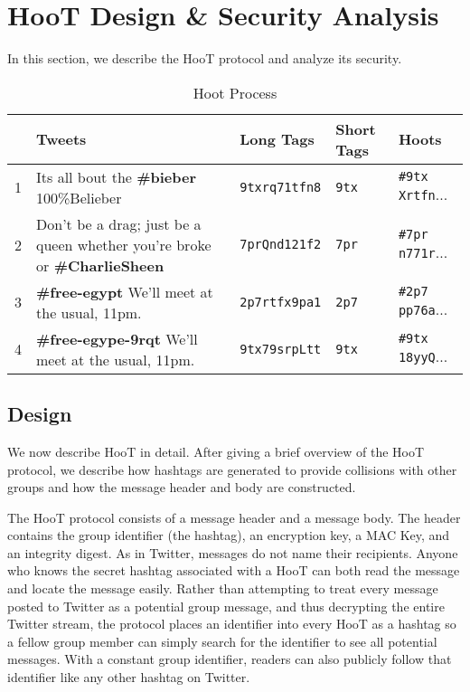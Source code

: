 \section{HooT Design \& Security Analysis}
\label{sec:design-sec}

In this section, we describe the HooT protocol and analyze its security.

\begin{table*}
\caption{Hoot Process
\label{tab:example}
}
\begin{center}
    \begin{tabular}{ l  l  l  l  l }
	\hline
	 & Tweets & Long Tags & Short Tags & Hoots \\ \hline
	1 & Its all bout the {\bf \#bieber} 100\%Belieber                                 & {\tt 9txrq71tfn8} &  {\tt 9tx} & {\tt \#9tx Xrtfn}... \\
	2 & Don't be a drag; just be a queen whether you're broke or {\bf \#CharlieSheen} & {\tt 7prQnd121f2} & {\tt 7pr} & {\tt \#7pr n771r}... \\
	3 & {\bf \#free-egypt} We'll meet at the usual, 11pm.                             & {\tt 2p7rtfx9pa1} & {\tt 2p7} & {\tt \#2p7 pp76a}... \\
	4 & {\bf \#free-egype-9rqt} We'll meet at the usual, 11pm.                        & {\tt 9tx79srpLtt} &  {\tt 9tx}  & {\tt \#9tx 18yyQ}... \\
    \end{tabular}
\end{center}
\end{table*}

\subsection{Design}
\label{sec:design}

We now describe HooT in detail. After giving a brief overview of the
HooT protocol, we describe how hashtags are generated to provide
collisions with other groups and how the message header and body are
constructed. 

 The HooT protocol consists of a message
header and a message body. The header contains the group identifier (the
hashtag), an encryption key, a MAC Key, and an integrity digest. As in
Twitter, messages do not name their recipients. Anyone who knows the
secret hashtag associated with a HooT can both read the message and
locate the message easily. Rather than attempting to treat every message
posted to Twitter as a potential group message, and thus decrypting the
entire Twitter stream, the protocol places an identifier into every HooT
as a hashtag so a fellow group member can simply search for the
identifier to see all potential messages. With a constant group
identifier, readers can also publicly follow that identifier like any
other hashtag on Twitter.

